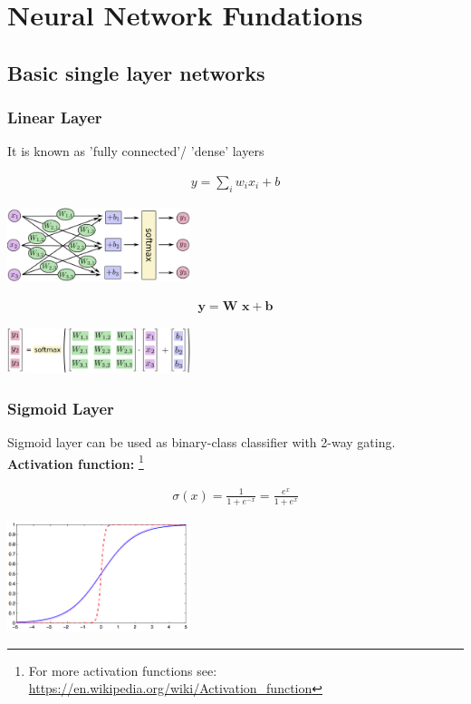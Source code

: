 \chapter{Neural Network Fundations}
\section{Basic single layer networks}

\subsection{Linear Layer}
It is known as 'fully connected'/ 'dense' layers

\begin{align}
	y=\sum_{i}w_ix_i+b
\end{align}

	\includegraphics[width=0.4\textwidth]{figures/linear01}

\begin{align}
	\textbf{y}= \textbf{W x} + \textbf{b}
\end{align}	


	\includegraphics[width=0.4\textwidth]{figures/linear02}

\subsection{Sigmoid Layer}
Sigmoid layer can be used as binary-class classifier with 2-way gating.\\
\textbf{Activation function:} \footnote{For more activation functions see:\\ {\small\url{https://en.wikipedia.org/wiki/Activation_function}}}

\begin{align}
	\sigma(x)=\frac{1}{1+ e^{-x}} = \frac{e^x}{1+e^{x}}
\end{align}

\vspace{-10pt}
\begin{center}
	\includegraphics[width=0.4\textwidth]{figures/Sigmoid}
\end{center}


